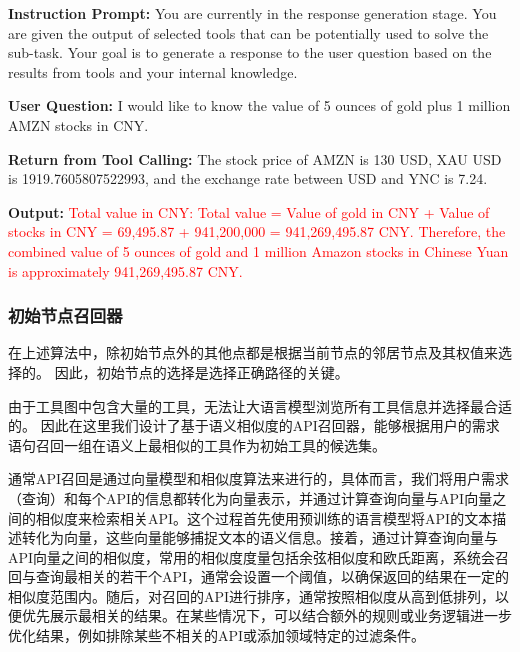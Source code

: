 
\begin{center}
\begin{tcolorbox}[colback=bgcolor, colframe=black, width=0.8\textwidth, boxrule=0.5mm, 
coltitle=white, colbacktitle=titlecolor, title=An Example for Response Generation with GPT-4]


\textbf{Instruction Prompt:} You are currently in the response generation stage. You are given the output of selected tools that can be potentially used to solve the sub-task. Your goal is to generate a response to the user question based on the results from tools and your internal knowledge.

\textbf{User Question:} I would like to know the value of 5 ounces of gold plus 1 million AMZN stocks in CNY.

\textbf{Return from Tool Calling:} The stock price of AMZN is 130 USD, XAU USD is 1919.7605807522993, and the exchange rate between USD and YNC is 7.24.

\textbf{Output:} \textcolor{red}{Total value in CNY: Total value = Value of gold in CNY + Value of stocks in CNY = 69,495.87 + 941,200,000 = 941,269,495.87 CNY. Therefore, the combined value of 5 ounces of gold and 1 million Amazon stocks in Chinese Yuan is approximately 941,269,495.87 CNY.}

\end{tcolorbox}

\end{center}

\subsubsection{初始节点召回器}

在上述算法中，除初始节点外的其他点都是根据当前节点的邻居节点及其权值来选择的。
因此，初始节点的选择是选择正确路径的关键。

由于工具图中包含大量的工具，无法让大语言模型浏览所有工具信息并选择最合适的。
因此在这里我们设计了基于语义相似度的API召回器，能够根据用户的需求语句召回一组在语义上最相似的工具作为初始工具的候选集。

通常API召回是通过向量模型和相似度算法来进行的，具体而言，我们将用户需求（查询）和每个API的信息都转化为向量表示，并通过计算查询向量与API向量之间的相似度来检索相关API。这个过程首先使用预训练的语言模型将API的文本描述转化为向量，这些向量能够捕捉文本的语义信息。接着，通过计算查询向量与API向量之间的相似度，常用的相似度度量包括余弦相似度和欧氏距离，系统会召回与查询最相关的若干个API，通常会设置一个阈值，以确保返回的结果在一定的相似度范围内。随后，对召回的API进行排序，通常按照相似度从高到低排列，以便优先展示最相关的结果。在某些情况下，可以结合额外的规则或业务逻辑进一步优化结果，例如排除某些不相关的API或添加领域特定的过滤条件。

